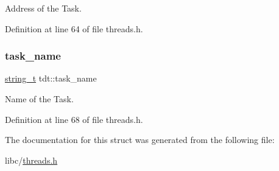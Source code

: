 Address of the Task. 



Definition at line 64 of file threads.\+h.

\mbox{\label{a00076_a46234f76421730447633c8b3d988ec23_a46234f76421730447633c8b3d988ec23}} 
\subsubsection{\texorpdfstring{task\+\_\+name}{task\_name}}
{\footnotesize\ttfamily \hyperlink{a00032_ab0dcbec9b4b3c60b939b1095f93cb1b9_ab0dcbec9b4b3c60b939b1095f93cb1b9}{string\+\_\+t} tdt\+::task\+\_\+name}



Name of the Task. 



Definition at line 68 of file threads.\+h.



The documentation for this struct was generated from the following file\+:\begin{DoxyCompactItemize}
\item 
libc/\hyperlink{a00044}{threads.\+h}\end{DoxyCompactItemize}
